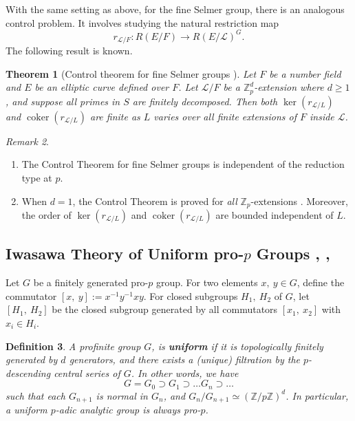 \documentclass{amsart}
\DeclareMathOperator{\coker}{coker}
\newcommand{\ZZ}{\mathbb Z}
\newcommand{\Linf}{\mathcal{L}}
\newtheorem{Th}{Theorem}[section]
\newtheorem{Defi}[Th]{Definition}
\theoremstyle{definition}
\theoremstyle{remark}
\newtheorem{rem}[Th]{Remark}
\begin{document}
With the same setting as above, for the fine Selmer group, there is an analogous control problem.
It involves studying the natural restriction map
\[
r_{\Linf/F}: R\left(E/F\right) \rightarrow R\left(E/\Linf\right)^{G}.
\]
The following result is known.
\begin{Th}[Control theorem for fine Selmer groups {\cite[Chapter VII, Section 4]{Rub00}}]
\label{control theorem for fsg}
Let $F$ be a number field and $E$ be an elliptic curve defined over $F$.
Let $\Linf/F$ be a $\ZZ_p^d$-extension where $d\geq 1$, and suppose all primes in $S$ are finitely decomposed.
Then both $\ker(r_{\Linf/L})$ and $\coker(r_{\Linf/L})$ are finite as $L$ varies over all finite extensions of $F$ inside $\Linf$.
\end{Th}

\begin{rem}
\begin{enumerate}
\item The Control Theorem for fine Selmer groups is independent of the reduction type at $p$.
\item When $d=1$, the Control Theorem is proved for \textit{all} $\ZZ_p$-extensions \cite{Wut04_thesis}.
Moreover, the order of $\ker(r_{\Linf/L})$ and $\coker(r_{\Linf/L})$ are bounded independent of $L$.
\end{enumerate}
\end{rem}

\subsection{Iwasawa Theory of Uniform pro-$p$ Groups \cite{DdSMS03}, \cite{How02}, \cite{Ven02}}
Let $G$ be a finitely generated pro-$p$ group.
For two elements $x, \ y\in G$, define the commutator $[x, \ y] := x^{-1}y^{-1}xy$.
For closed subgroups $H_1, \ H_2$ of $G$, let $[H_1, \ H_2]$ be the closed subgroup generated by all commutators $[x_1, \ x_2]$ with $x_i \in H_i$.

\begin{Defi}
A profinite group $G$, is \textbf{uniform} if it is topologically finitely generated by $d$ generators, and there exists a (unique) filtration by the $p$-descending central series of $G$.
In other words, we have
\[
G = G_0 \supset G_1 \supset \ldots G_n \supset \ldots
\]
such that each $G_{n+1}$ is normal in $G_n$, and $G_n/G_{n+1} \simeq \left(\ZZ/p\ZZ\right)^d$.
In particular, a uniform $p$-adic analytic group is always pro-$p$.
\end{Defi}
\end{document}
